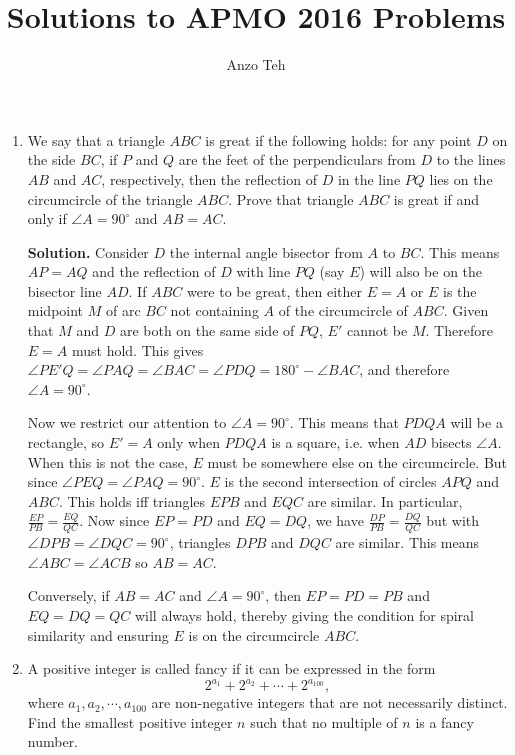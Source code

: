 \documentclass[11pt,a4paper]{article}
\begin{document}
\newcommand{\la}{\leftarrow}
\newcommand{\lra}{\leftrightarrow}
\newcommand{\bbN}{\mathbb{N}}
\newcommand{\bbZ}{\mathbb{Z}}
\newcommand{\dsum}{\displaystyle\sum}
\newcommand{\dprod}{\displaystyle\prod}


\title{Solutions to APMO 2016 Problems}
\author{Anzo Teh}
\date{}
\maketitle

\begin{enumerate}
	\item We say that a triangle $ABC$ is great if the following holds: for any point $D$ on the side $BC$, if $P$ and $Q$ are the feet of the perpendiculars from $D$ to the lines $AB$ and $AC$, respectively, then the reflection of $D$ in the line $PQ$ lies on the circumcircle of the triangle $ABC$. Prove that triangle $ABC$ is great if and only if $\angle A = 90^{\circ}$ and $AB = AC$.
	
	\textbf{Solution.} Consider $D$ the internal angle bisector from $A$ to $BC$. This means $AP=AQ$ and the reflection of $D$ with line $PQ$ (say $E$) will also be on the bisector line $AD$. If $ABC$ were to be great, then either $E=A$ or $E$ is the midpoint $M$ of arc $BC$ not containing $A$ of the circumcircle of $ABC$. Given that $M$ and $D$ are both on the same side of $PQ$, $E'$ cannot be $M$. Therefore $E=A$ must hold. This gives $\angle PE'Q=\angle PAQ=\angle BAC=\angle PDQ=180^{\circ}-\angle BAC$, and therefore $\angle A=90^{\circ}$. 
	
	Now we restrict our attention to $\angle A=90^{\circ}$. This means that $PDQA$ will be a rectangle, so $E'=A$ only when $PDQA$ is a square, i.e. when $AD$ bisects $\angle A$. When this is not the case, $E$ must be somewhere else on the circumcircle. But since $\angle PEQ=\angle PAQ=90^{\circ}$. $E$ is the second intersection of circles $APQ$ and $ABC$. This holds iff triangles $EPB$ and $EQC$ are similar. In particular, $\frac{EP}{PB}=\frac{EQ}{QC}$. Now since $EP=PD$ and $EQ=DQ$, we have $\frac{DP}{PB}=\frac{DQ}{QC}$ but with $\angle DPB=\angle DQC=90^{\circ}$, triangles $DPB$ and $DQC$ are similar. This means $\angle ABC=\angle ACB$ so $AB=AC$. 
	
	Conversely, if $AB=AC$ and $\angle A=90^{\circ}$, then $EP=PD=PB$ and $EQ=DQ=QC$ will always hold, thereby giving the condition for spiral similarity and ensuring $E$ is on the circumcircle $ABC$. 
	
	\item A positive integer is called fancy if it can be expressed in the form $$2^{a_1}+2^{a_2}+ \cdots+ 2^{a_{100}},$$where $a_1,a_2, \cdots, a_{100}$ are non-negative integers that are not necessarily distinct. Find the smallest positive integer $n$ such that no multiple of $n$ is a fancy number.
	

\end{enumerate}
\end{document}
